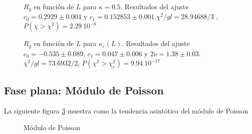 \begin{figure}[h]
  \centering
  
   \caption{$R_g$ en función de $L$ para $\kappa=0.5$. Resultados del ajuste
     $c_0=0.2929 \pm 0.004$ y $c_1=0.152853\pm 0.001$.$\chi^2/gl=28.94688/3$ ,
     $P(\chi>\chi^2)=2.29\ 10^{-6}$}\label{rg2_rugosa}







\end{figure}

\begin{figure}[h]
  \centering
  
  \caption{$R_g$ en función de $L$ para $\kappa_c(L)$. Resultados del ajuste
    $c_0=-0.535 \pm 0.089$, $c_1=0.047\pm 0.006$ y $2\nu=1.38\pm
    0.03$. $\chi^2/gl=73.6932/2$, $P(\chi^2>\chi_c^2)=9.94 \ 10^{-17}$}\label{Rg2_transicion}







\end{figure}

\clearpage


\subsection{Fase plana: Módulo de Poisson}

La siguiente figura \ref{poisson-fig} muestra como la tendencia asintótica del
módulo de Poisson 
\begin{figure}[h]
  \centering
  
  \caption{Módulo de Poisson}\label{poisson-fig}
\end{figure}
